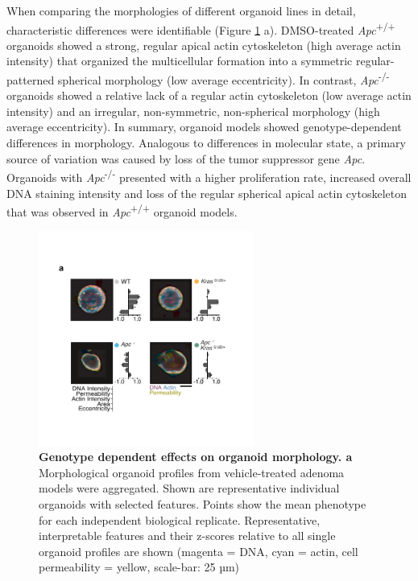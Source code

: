 \begin{flushleft}
When comparing the morphologies of different organoid lines in detail, characteristic differences were identifiable (Figure \ref{fig_130} a). DMSO-treated \textit{Apc}\textsuperscript{+/+} organoids showed a strong, regular apical actin cytoskeleton (high average actin intensity) that organized the multicellular formation into a symmetric regular-patterned spherical morphology (low average eccentricity). In contrast, \textit{Apc}\textsuperscript{-/-}  organoids showed a relative lack of a regular actin cytoskeleton (low average actin intensity) and an irregular, non-symmetric, non-spherical morphology (high average eccentricity). In summary, organoid models showed genotype-dependent differences in morphology. Analogous to differences in molecular state, a primary source of variation was caused by loss of the tumor suppressor gene \textit{Apc}. Organoids with \textit{Apc}\textsuperscript{-/-} presented with a higher proliferation rate, increased overall DNA staining intensity and loss of the regular spherical apical actin cytoskeleton that was observed in \textit{Apc}\textsuperscript{+/+} organoid models.

\begin{figure}[h!]
\centering
\includegraphics[width=200pt,
                height=\textheight,
                keepaspectratio]{figures/adenomaprofiling/pdf/fig_1_3.pdf}
\caption[Genotype dependent effects on organoid morphology]{\textbf{Genotype dependent effects on organoid morphology. a}  Morphological organoid profiles from vehicle-treated adenoma models were aggregated. Shown are representative individual organoids with selected features. Points show the mean phenotype for each independent biological replicate. Representative, interpretable features and their z-scores relative to all single organoid profiles are shown (magenta = DNA, cyan = actin, cell permeability = yellow, scale-bar: 25 µm)}
\label{fig_130}
\end{figure}
\bigbreak



\end{flushleft}
